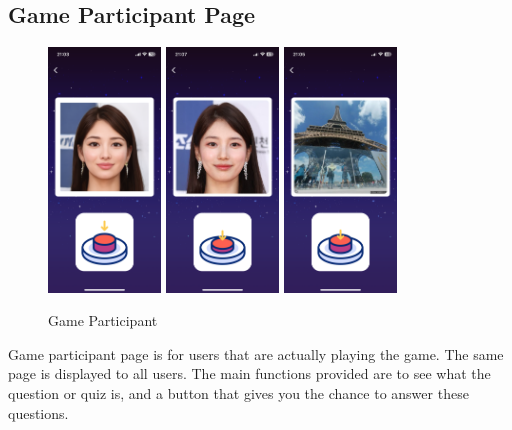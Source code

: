 \documentclass[conference]{IEEEtran}
\begin{document}
    \subsection{Game Participant Page}
        \begin{figure}[htbp]
            \centerline{\includegraphics[width=3cm]{Images/screen/game/disney/DISNEY1_PLAYER.PNG}
            \includegraphics[width=3cm]{Images/screen/game/disney/DISNEY1_PLAYER_ANSWER.PNG}
            \includegraphics[width=3cm]{Images/screen/game/geo/GEO1_PLAYER.PNG}}
            \caption{Game Participant}
            \label{fig}
        \end{figure}
        Game participant page is for users that are actually playing the game. The same page is displayed to all users. The main functions provided are to see what the question or quiz is, and a button that gives you the chance to answer these questions. \\
\end{document}
